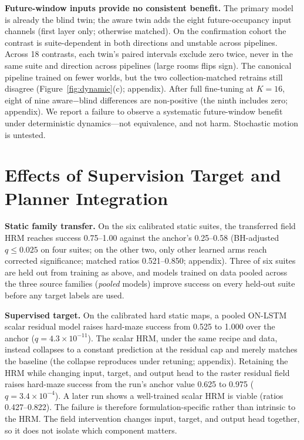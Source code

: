 \documentclass[letterpaper]{article} %
\begin{document}
\textbf{Future-window inputs provide no consistent benefit.} The primary model is already the blind twin; the aware twin adds the eight future-occupancy input channels (first layer only; otherwise matched). On the confirmation cohort the contrast is suite-dependent in both directions and unstable across pipelines. Across 18 contrasts, each twin's paired intervals exclude zero twice, never in the same suite and direction across pipelines (large rooms flips sign). The canonical pipeline trained on fewer worlds, but the two collection-matched retrains still disagree (Figure~\ref{fig:dynamic}(c); appendix). After full fine-tuning at $K{=}16$, eight of nine aware$-$blind differences are non-positive (the ninth includes zero; appendix). We report a failure to observe a systematic future-window benefit under deterministic dynamics---not equivalence, and not harm. Stochastic motion is untested.

\section{Effects of Supervision Target and Planner Integration}

\textbf{Static family transfer.} On the six calibrated static suites, the transferred field HRM reaches success 0.75--1.00 against the anchor's 0.25--0.58 (BH-adjusted $q \leq 0.025$ on four suites; on the other two, only other learned arms reach corrected significance; matched ratios 0.521--0.850; appendix). Three of six suites are held out from training as above, and models trained on data pooled across the three source families (\emph{pooled} models) improve success on every held-out suite before any target labels are used.

\textbf{Supervised target.} On the calibrated hard static maps, a pooled ON-LSTM scalar residual model raises hard-maze success from 0.525 to 1.000 over the anchor ($q=4.3\times10^{-11}$). The scalar HRM, under the same recipe and data, instead collapses to a constant prediction at the residual cap and merely matches the baseline (the collapse reproduces under retuning; appendix). Retaining the HRM while changing input, target, and output head to the raster residual field raises hard-maze success from the run's anchor value 0.625 to 0.975 ($q=3.4\times10^{-4}$). A later run shows a well-trained scalar HRM is viable (ratios 0.427--0.822). The failure is therefore formulation-specific rather than intrinsic to the HRM. The field intervention changes input, target, and output head together, so it does not isolate which component matters.
\end{document}
